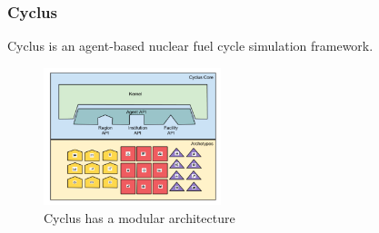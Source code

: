 \begin{frame}
    \frametitle{Cyclus}
        Cyclus is an agent-based nuclear fuel cycle simulation
        framework. 
    \begin{figure}[htbp!]
      \begin{center}
        \includegraphics[height=4cm]{../figures/cyclus-modular}
      \end{center}
            \caption{Cyclus has a modular architecture \cite{huff_fundamentals_2016}}
      \label{fig:cyclus-modular}
    \end{figure}
  \end{frame}
  